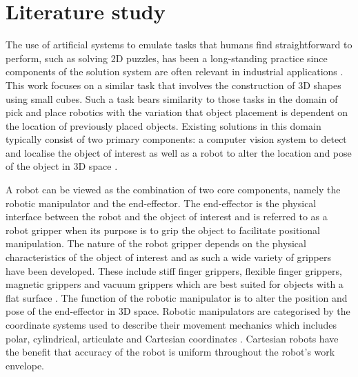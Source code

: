 
\section{Literature study}

The use of artificial systems to emulate tasks that humans find straightforward to perform, such as solving 2D puzzles, has been a long-standing practice since components of the solution system are often relevant in industrial applications \cite{Burdea:Solving_Jigsaw_Puzzles_by_a_Robot}. This work focuses on a similar task that involves the construction of 3D shapes using small cubes. Such a task bears similarity to those tasks in the domain of pick and place robotics with the variation that object placement is dependent on the location of previously placed objects. Existing solutions in this domain typically consist of two primary components: a computer vision system to detect and localise the object of interest as well as a robot to alter the location and pose of the object in 3D space \cite{Sharath:Gantry_Robot_Design}.

A robot can be viewed as the combination of two core components, namely the robotic manipulator and the end-effector. The end-effector is the physical interface between the robot and the object of interest and is referred to as a robot gripper when its purpose is to grip the object to facilitate positional manipulation. The nature of the robot gripper depends on the physical characteristics of the object of interest and as such a wide variety of grippers have been developed. These include stiff finger grippers, flexible finger grippers, magnetic grippers and vacuum grippers which are best suited for objects with a flat surface \cite{Lundstrom:Industrial_Robot_Grippers}. The function of the robotic manipulator is to alter the position and pose of the end-effector in 3D space. Robotic manipulators are categorised by the coordinate systems used to describe their movement mechanics which includes polar, cylindrical, articulate and Cartesian coordinates \cite{Miller:Robots_and_Robotics_Principles}. Cartesian robots have the benefit that accuracy of the robot is uniform throughout the robot's work envelope.

